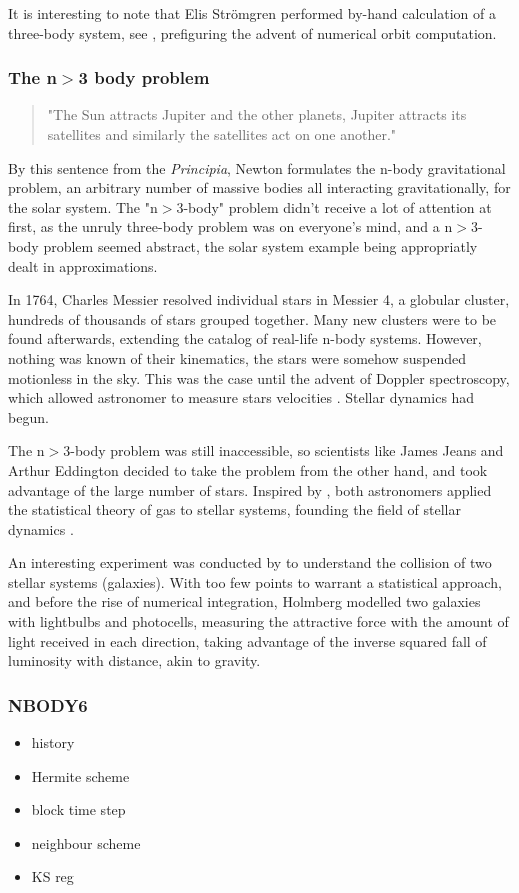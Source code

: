It is interesting to note that Elis Str\"omgren performed by-hand calculation of a three-body system, see \cite{Aarseth2003,Stromgren1909}, prefiguring the advent of numerical orbit computation.

\subsubsection*{The n$>$3 body problem}

\begin{quote}
"The Sun attracts Jupiter and the other planets, Jupiter attracts its satellites and similarly the satellites act on one another."
\end{quote}

By this sentence from the \textit{Principia}, Newton formulates the n-body gravitational problem, an arbitrary number of massive bodies all interacting gravitationally, for the solar system. The "n$>$3-body" problem didn't receive a lot of attention at first, as the unruly three-body problem was on everyone's mind, and a n$>$3-body problem seemed abstract, the solar system example being appropriatly dealt in approximations.

In 1764, Charles Messier resolved individual stars in Messier 4, a globular cluster, hundreds of thousands of stars grouped together. Many new clusters were to be found afterwards, extending the catalog of real-life n-body systems. However, nothing was known of their kinematics, the stars were somehow suspended motionless in the sky. This was the case until the advent of Doppler spectroscopy, which allowed astronomer to measure stars velocities \citep{Doppler1842}. Stellar dynamics had begun.

The n$>$3-body problem was still inaccessible, so scientists like James Jeans and Arthur Eddington decided to take the problem from the other hand, and took advantage of the large number of stars. Inspired by \cite{Poincare1906}, both astronomers applied the statistical theory of gas to stellar systems, founding the field of stellar dynamics \citep{Jeans1916,Eddington1916}.

An interesting experiment was conducted by \cite{Holmberg1941} to understand the collision of two stellar systems (galaxies). With too few points to warrant a statistical approach, and before the rise of numerical integration, Holmberg modelled two galaxies with lightbulbs and photocells, measuring the attractive force with the amount of light received in each direction, taking advantage of the inverse squared fall of luminosity with distance, akin to gravity.




\newpage
\subsubsection{NBODY6}

\begin{itemize}
\item history
\item Hermite scheme
\item block time step
\item neighbour scheme
\item KS reg
\end{itemize}












